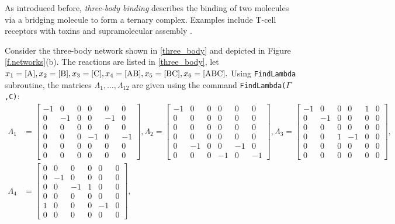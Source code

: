 \documentclass[onefignum,onetabnum]{siamonline220329}
\begin{document}
{As introduced before,  \emph{three-body binding} \cite{douglass13} describes the binding of two molecules via a bridging molecule to form a ternary complex. Examples include T-cell receptors with toxins \cite{saline10}  and supramolecular assembly \cite{sagar17}. 

Consider the three-body network shown in \eqref{three_body} and depicted in Figure \ref{f.networks}(b). 
The reactions are listed in \eqref{three_body}, let $x_1=[{\rm A}], x_2=[{\rm B}], x_3=[{\rm C}], x_4=[{\rm AB}], x_5=[{\rm BC}],x_6=[{\rm ABC}].$%
  Using \texttt{FindLambda} subroutine, the matrices $\Lambda_1,\dots,\Lambda_{12}$ are given {using the command \texttt{FindLambda($\Gamma$,C)}}: 
{\tiny \begin{align*}\Lambda_1&=
\left[\begin{array}{cccccc} -1 & 0 & 0 & 0 & 0 & 0\\ 0 & -1 & 0 & 0 & -1 & 0\\ 0 & 0 & 0 & 0 & 0 & 0\\ 0 & 0 & 0 & -1 & 0 & -1\\ 0 & 0 & 0 & 0 & 0 & 0\\ 0 & 0 & 0 & 0 & 0 & 0 \end{array}\right],
\Lambda_2=\left[\begin{array}{cccccc} -1 & 0 & 0 & 0 & 0 & 0\\ 0 & 0 & 0 & 0 & 0 & 0\\ 0 & 0 & 0 & 0 & 0 & 0\\ 0 & 0 & 0 & 0 & 0 & 0\\ 0 & -1 & 0 & 0 & -1 & 0\\ 0 & 0 & 0 & -1 & 0 & -1 \end{array}\right], 
\Lambda_3=
\left[\begin{array}{cccccc} -1 & 0 & 0 & 0 & 1 & 0\\ 0 & -1 & 0 & 0 & 0 & 0\\ 0 & 0 & 0 & 0 & 0 & 0\\ 0 & 0 & 1 & -1 & 0 & 0\\ 0 & 0 & 0 & 0 & 0 & 0\\ 0 & 0 & 0 & 0 & 0 & 0 \end{array}\right], \\
\Lambda_4&=\left[\begin{array}{cccccc} 0 & 0 & 0 & 0 & 0 & 0\\ 0 & -1 & 0 & 0 & 0 & 0\\ 0 & 0 & -1 & 1 & 0 & 0\\ 0 & 0 & 0 & 0 & 0 & 0\\ 1 & 0 & 0 & 0 & -1 & 0\\ 0 & 0 & 0 & 0 & 0 & 0 \end{array}\right],  

\end{align*}}}
\end{document}
